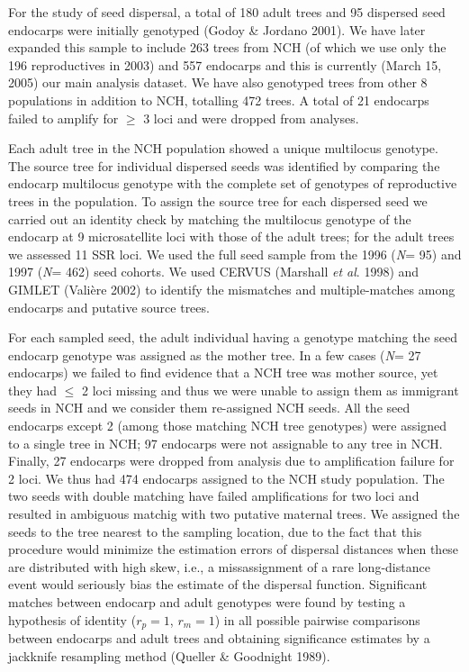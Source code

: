 \documentclass[a4paper,12pt]{article}
\newcommand{\tab}{\hspace{5mm}}
\begin{document}
\tab For the study of seed dispersal, a total of 180 adult trees and 95 dispersed seed endocarps were initially genotyped (Godoy \& Jordano 2001). We have later expanded this sample to include 263 trees from NCH (of which we use only the 196 reproductives in 2003) and 557 endocarps and this is currently (March 15, 2005) our main analysis dataset. We have also genotyped trees from other 8 populations in addition to NCH, totalling 472 trees. A total of 21 endocarps failed to amplify for \ensuremath{\geq} 3 loci and were dropped from analyses.

\tab Each adult tree in the NCH population showed a unique multilocus genotype. The source tree for individual dispersed seeds was identified by comparing the endocarp multilocus genotype with the complete set of genotypes of reproductive trees in the population. To assign the source tree for each dispersed seed we carried out an identity check by matching the multilocus genotype of the endocarp at 9 microsatellite loci with those of the adult trees; for the adult trees we assessed 11 SSR loci. We used the full seed sample from the 1996 (\textit{N}= 95) and 1997 (\textit{N}= 462) seed cohorts. We used CERVUS (Marshall \textit{et al}. 1998) and GIMLET (Vali\`{e}re 2002) to identify the mismatches and multiple-matches among endocarps and putative source trees.

\tab For each sampled seed, the adult individual having a genotype matching the seed endocarp genotype was assigned as the mother tree. In a few cases (\textit{N}= 27 endocarps) we failed to find evidence that a NCH tree was mother source, yet they had \ensuremath{\leq} 2 loci missing and thus we were unable to assign them as immigrant seeds in NCH and we consider them re-assigned NCH seeds. All the seed endocarps except 2 (among those matching NCH tree genotypes) were assigned to a single tree in NCH; 97 endocarps were not assignable to any tree in NCH. Finally, 27 endocarps were dropped from analysis due to amplification failure for \texttt{}2 loci. We thus had 474 endocarps assigned to the NCH study population. The two seeds with double matching have failed amplifications for two loci and resulted in ambiguous matchig with two putative maternal trees. We assigned the seeds to the tree nearest to the sampling location, due to the fact that this procedure would minimize the estimation errors of dispersal distances when these are distributed with high skew, i.e., a missassignment of a rare long-distance event would seriously bias the estimate of the dispersal function. Significant matches between endocarp and adult genotypes were found by testing a hypothesis of identity ($r_{p}= 1$, $r_{m}= 1$) in all possible pairwise comparisons between endocarps and adult trees and obtaining significance estimates by a jackknife resampling method (Queller \& Goodnight 1989). 
\end{document}
